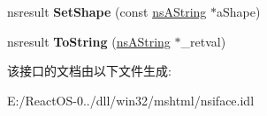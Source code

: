\begin{DoxyCompactItemize}
\item 
\mbox{\label{interfacens_i_d_o_m_h_t_m_l_anchor_element_a0b007d3c983f316db55736ad22702717}} 
nsresult {\bfseries Set\+Shape} (const \hyperlink{structns_string_container}{ns\+A\+String} $\ast$a\+Shape)
\item 
\mbox{\label{interfacens_i_d_o_m_h_t_m_l_anchor_element_abfacc345c65224c7b42c2c9ca52a1d1a}} 
nsresult {\bfseries To\+String} (\hyperlink{structns_string_container}{ns\+A\+String} $\ast$\+\_\+retval)
\end{DoxyCompactItemize}


该接口的文档由以下文件生成\+:\begin{DoxyCompactItemize}
\item 
E\+:/\+React\+O\+S-\/0../dll/win32/mshtml/nsiface.\+idl\end{DoxyCompactItemize}
